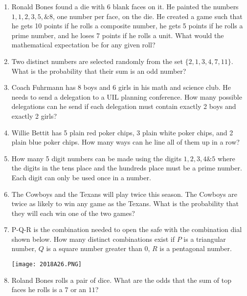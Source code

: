 \documentclass[../uilmath.tex]{subfiles}
\begin{document}
\begin{enumerate}[label=\bfseries\arabic*.]
    \item %
    Ronald Bones found a die with 6 blank faces on it. He painted the numbers $1,1,2,3,5,\& 8$, one number per face, on the die.
    He created a game such that he gets 10 points if he rolls a composite number, he gets 5 points if he rolls a prime number, and he loses 
    7 points if he rolls a unit. What would the mathematical expectation be for any given roll?

    \item %
    Two distinct numbers are selected randomly from the set $\{2,1,3,4,7,11\}$. What is the probability that their sum is an odd number?

    \item %
    Coach Fuhrmann has 8 boys and 6 girls in his math and science club. He needs to send a delegation to a UIL planning conference. 
    How many possible delegations can he send if each delegation must contain exactly 2 boys and exactly 2 girls?

    \item %
    Willie Bettit has 5 plain red poker chips, 3 plain white poker chips, and 2 plain blue poker chips. How many ways can he line all of them up in a row?

    \item %
    How many 5 digit numbers can be made using the digits $1,2,3,4 \& 5$ where the digits in the tens place and the hundreds place must be a prime number. Each digit can only be used once in a number.

    \item %
    The Cowboys and the Texans will play twice this season. The Cowboys are twice as likely to win any game as the Texans. What is the probability that they will each win one of the two games?

    \item %
    P-Q-R is the combination needed to open the safe with the combination dial shown below. How many distinct combinations exist if $P$ is a triangular number, $Q$ is a square number 
    greater than 0, $R$ is a pentagonal number.
    \begin{center}
        \texttt{[image: 2018A26.PNG]}
    \end{center}

    \item %
    Roland Bones rolls a pair of dice. What are the odds that the sum of top faces he rolls is a $7$ or an $11$?


\end{enumerate}
\end{document}
